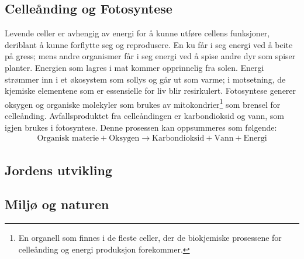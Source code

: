 \documentclass[main.tex]{subfiles}
\begin{document}
\subsection{Celleånding og Fotosyntese}
Levende celler er avhengig av energi for å kunne utføre cellens funksjoner, deriblant å kunne forflytte seg og reprodusere. En ku får i seg energi ved å beite på gress; mens andre organismer får i seg energi ved å spise andre dyr som spiser planter. Energien som lagres i mat kommer opprinnelig fra solen. Energi strømmer inn i et økosystem som sollys og går ut som varme; i motsetning, de kjemiske elementene som er essensielle for liv blir resirkulert. Fotosyntese generer oksygen og organiske molekyler som brukes av mitokondrier\footnote{En organell som finnes i de fleste celler, der de biokjemiske prosessene for celleånding og energi produksjon forekommer.} som brensel for celleånding. Avfallsproduktet fra celleåndingen er karbondioksid og vann, som igjen brukes i fotosyntese. Denne prosessen kan oppsummeres som følgende:
\begin{align*}
\text{Organisk materie} + \text{Oksygen} \longrightarrow \text{Karbondioksid} + \text{Vann} + \text{Energi}
\end{align*}

\subsection{Jordens utvikling}

\subsection{Miljø og naturen}
\end{document}
